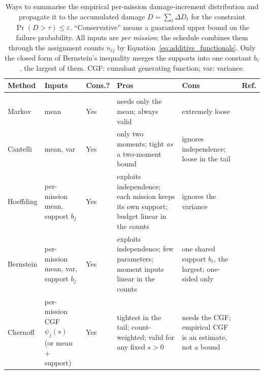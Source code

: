 \documentclass[11pt,a4paper]{article}
\theoremstyle{plain}
\theoremstyle{definition}
\theoremstyle{remark}
\begin{document}
\begin{table}[htbp]
\centering
\caption{Ways to summarise the empirical per-mission damage-increment distribution and propagate it to the accumulated damage $D = \sum_t \Delta D_t$ for the constraint $\Pr(D > \tau) \le \varepsilon$.
``Conservative'' means a guaranteed upper bound on the failure probability.
All inputs are \emph{per mission}; the schedule combines them through the assignment counts $n_{ij}$ by Equation~\eqref{eq:additive_functionals}. Only the closed form of Bernstein's inequality merges the supports into one constant $b_\ell$, the largest of them.
CGF: cumulant generating function; var: variance.}
\label{tab:cons_surrogates}
\footnotesize
\setlength{\tabcolsep}{4.5pt}
\begin{tabularx}{\linewidth}{@{}>{\hsize=0.846\hsize\raggedright\arraybackslash}X>{\hsize=0.946\hsize\raggedright\arraybackslash}X>{\hsize=0.573\hsize\raggedright\arraybackslash}X>{\hsize=1.444\hsize\raggedright\arraybackslash}X>{\hsize=1.444\hsize\raggedright\arraybackslash}X>{\hsize=0.747\hsize\raggedright\arraybackslash}X@{}}
\toprule
\rowcolor{headgrey}
\textbf{Method} & \textbf{Inputs} & \textbf{Cons.?} & \textbf{Pros} & \textbf{Cons} & \textbf{Ref.} \\
\midrule
\multicolumn{6}{@{}l}{\textit{Route I --- bound the tail of $D$ directly}} \\
Markov
  & mean
  & Yes
  & needs only the mean; always valid
  & extremely loose
  & \cite{BertsimasPopescu2005} \\[3pt]
Cantelli
  & mean, var
  & Yes
  & only two moments; tight \emph{as} a two-moment bound
  & ignores independence; loose in the tail
  & \cite{BertsimasPopescu2005} \\[3pt]
Hoeffding
  & per-mission mean, support $b_j$
  & Yes
  & exploits independence; each mission keeps its own support; budget linear in the counts
  & ignores the variance
  & \cite[Thm.~2]{Hoeffding1963} \\[3pt]
Bernstein
  & per-mission mean, var, support $b_j$
  & Yes
  & exploits independence; few parameters; moment inputs linear in the counts
  & one shared support $b_\ell$, the largest; one-sided only
  & \cite{BoucheronLugosiMassart2013} \\[3pt]
Chernoff
  & per-mission CGF $\psi_j(s)$ (or mean $+$ support)
  & Yes
  & tightest in the tail; count-weighted; valid for any fixed $s>0$
  & needs the CGF; empirical CGF is an estimate, not a bound
  & \cite{Chernoff1952} \\[3pt]
\bottomrule
\end{tabularx}
\end{table}
\end{document}
